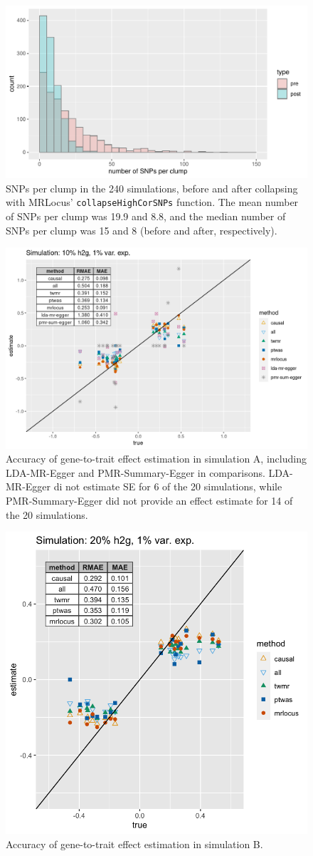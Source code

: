 \documentclass[11pt]{article}
\begin{document}
\begin{figure}[!ht]
  \centering
  \includegraphics[width=.7\textwidth]{figs/snps-per-clump}
  \caption{SNPs per clump in the 240 simulations, before and after
    collapsing with MRLocus’ \texttt{collapseHighCorSNPs}
    function. The mean number of SNPs per clump was 19.9 and 8.8, and
    the median number of SNPs per clump was 15 and 8 (before and
    after, respectively).}
\end{figure}

\begin{figure}[!ht]
  \centering
  \includegraphics[width=.7\textwidth]{figs/sim1extra.png}
  \caption{Accuracy of gene-to-trait effect estimation in simulation
    A, including LDA-MR-Egger and PMR-Summary-Egger in
    comparisons. LDA-MR-Egger di not estimate SE for 6 of the 20
    simulations, while PMR-Summary-Egger did not provide an effect
    estimate for 14 of the 20 simulations.}
\end{figure}

\begin{figure}[!ht]
  \centering
  \includegraphics[width=.6\textwidth]{figs/sim3.png}
  \caption{Accuracy of gene-to-trait effect estimation in simulation B.}
\end{figure}
\end{document}
